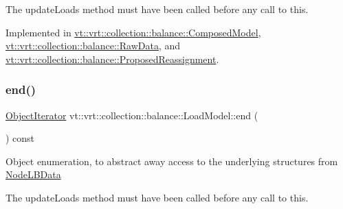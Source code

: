 The {\ttfamily update\+Loads} method must have been called before any call to this. 

Implemented in \hyperlink{classvt_1_1vrt_1_1collection_1_1balance_1_1_composed_model_a7d32b6f8a0ca5970674238325df11783}{vt\+::vrt\+::collection\+::balance\+::\+Composed\+Model}, \hyperlink{structvt_1_1vrt_1_1collection_1_1balance_1_1_raw_data_acfe356d51313995dacf50868f3fac19b}{vt\+::vrt\+::collection\+::balance\+::\+Raw\+Data}, and \hyperlink{structvt_1_1vrt_1_1collection_1_1balance_1_1_proposed_reassignment_ad7a65c6be802368df458f6005ef69d23}{vt\+::vrt\+::collection\+::balance\+::\+Proposed\+Reassignment}.

\mbox{\label{structvt_1_1vrt_1_1collection_1_1balance_1_1_load_model_a2b3212a8438a4b58a73c41db841f15b7}} 
\subsubsection{\texorpdfstring{end()}{end()}}
{\footnotesize\ttfamily \hyperlink{structvt_1_1vrt_1_1collection_1_1balance_1_1_object_iterator}{Object\+Iterator} vt\+::vrt\+::collection\+::balance\+::\+Load\+Model\+::end (\begin{DoxyParamCaption}{ }\end{DoxyParamCaption}) const\hspace{0.3cm}{\ttfamily [inline]}}

Object enumeration, to abstract away access to the underlying structures from \hyperlink{structvt_1_1vrt_1_1collection_1_1balance_1_1_node_l_b_data}{Node\+L\+B\+Data}

The {\ttfamily update\+Loads} method must have been called before any call to this. \mbox{\label{structvt_1_1vrt_1_1collection_1_1balance_1_1_load_model_a1143c5dda0d3e409db174d5de6bfceb5}} 

